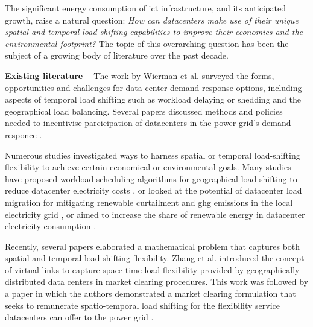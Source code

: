 The significant energy consumption of \gls{ict} infrastructure, and its anticipated growth, raise a natural question: \textit{How can datacenters make use of their unique spatial and temporal load-shifting capabilities to improve their economics and the environmental footprint?} The topic of this overarching question has been the subject of a growing body of literature over the past decade.

\textbf{Existing literature --} The work by Wierman et al.  \cite{wiermanOpportunitiesChallengesData2014} surveyed the forms, opportunities and challenges for data center demand response options, including aspects of temporal load shifting such as workload delaying or shedding and the geographical load balancing. Several papers discussed methods and policies needed to incentivise parcicipation of datacenters in the power grid's demand responce \cite{liuPricingDataCenter2014, zhouTruthfulEfficientIncentive2020}.

Numerous studies investigated ways to harness spatial or temporal load-shifting flexibility to achieve certain economical or environmental goals. Many studies have proposed workload scheduling algorithms for geographical load shifting to reduce datacenter electricity costs \cite{velascoElasticOperationsFederated2014, douCarbonAwareElectricityCost2017, heMinimizingOperationCost2021, raoDistributedCoordinationInternet2012, renCarbonAwareEnergyCapacity2012, dengEcoAwareOnlinePower2016}, or looked at the potential of datacenter load migration for mitigating renewable curtailment and \gls{ghg} emissions in the local electricity grid \cite{zhengMitigatingCurtailmentCarbon2020, mahmudDistributedFrameworkCarbon2016}, or aimed to increase the share of renewable energy in datacenter electricity consumption \cite{wangGreenawareVirtualMachine2015, kimDataCentersDispatchable2017, liuGeographicalLoadBalancing2011, kellyBalancingPowerSystems2016}.

Recently, several papers elaborated a mathematical problem that captures both spatial and temporal load-shifting flexibility. Zhang et al. \cite{zhangFlexibilityNetworksData2020} introduced the concept of virtual links to capture space-time load flexibility provided by geographically-distributed data centers in market clearing procedures. This work was followed by a paper in which the authors demonstrated a market clearing formulation that seeks to remunerate spatio-temporal load shifting for the flexibility service datacenters can offer to the power grid \cite{zhangRemuneratingSpaceTime2022}.

